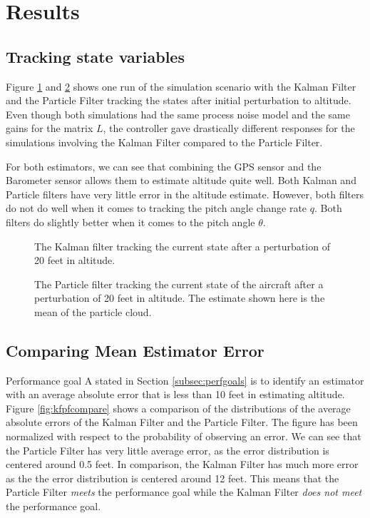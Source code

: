 \section{Results} \label{sec:results}

\subsection{Tracking state variables}
Figure \ref{fig:kf} and \ref{fig:pf} shows one run of the simulation
scenario with the Kalman Filter and the Particle Filter tracking the
states after initial perturbation to altitude. Even though both
simulations had the same process noise model and the same gains for
the matrix $L$, the controller gave drastically different responses
for the simulations involving the Kalman Filter compared to the
Particle Filter.

For both estimators, we can see that combining the GPS sensor and the
Barometer sensor allows them to estimate altitude quite well. Both
Kalman and Particle filters have very little error in the altitude
estimate. However, both filters do not do well when it comes to
tracking the pitch angle change rate $q$. Both filters do slightly
better when it comes to the pitch angle $\theta$. 

\begin{figure}[h]
  \caption{The Kalman filter tracking the current state after a
    perturbation of 20 feet in altitude.}
  \label{fig:kf}
\end{figure}

\begin{figure}
  \caption{The Particle filter tracking the current state of the
    aircraft after a perturbation of 20 feet in altitude. The
    estimate shown here is the mean of the particle cloud. }
  \label{fig:pf}
\end{figure}

\subsection{Comparing Mean Estimator Error}

Performance goal A stated in Section \ref{subsec:perfgoals} is to
identify an estimator with an average absolute error that is less than
10 feet in estimating altitude. Figure \ref{fig:kfpfcompare} shows a
comparison of the distributions of the average absolute errors of the
Kalman Filter and the Particle Filter. The figure has been normalized
with respect to the probability of observing an error. We can see that
the Particle Filter has very little average error, as the error
distribution is centered around 0.5 feet. In comparison, the Kalman
Filter has much more error as the the error distribution is centered
around 12 feet. This means that the Particle Filter \textit{meets} the
performance goal while the Kalman Filter \textit{does not meet} the
performance goal. 

